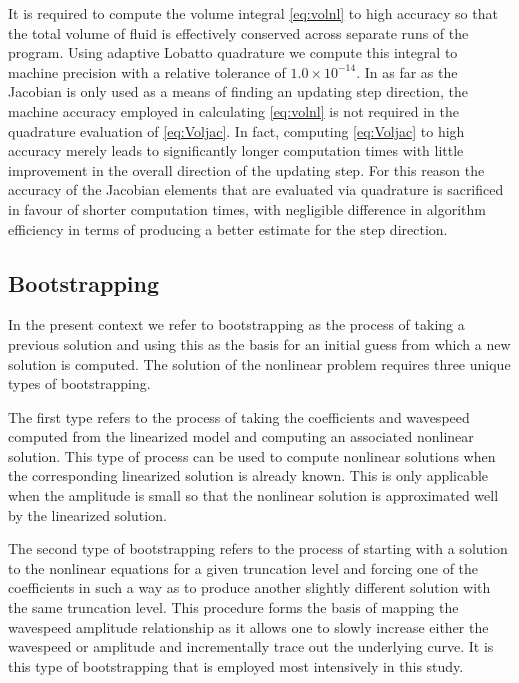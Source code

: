 It is required to compute the volume integral \eqref{eq:volnl} to high accuracy so that the total volume of fluid is effectively conserved across separate runs of the program. Using adaptive Lobatto quadrature we compute this integral to machine precision with a relative tolerance of $1.0\times10^{-14}$. In as far as the Jacobian is only used as a means of finding an updating step direction, the machine accuracy employed in calculating \eqref{eq:volnl} is not required in the quadrature evaluation of \eqref{eq:Voljac}. In fact, computing \eqref{eq:Voljac} to high accuracy merely leads to significantly longer computation times with little improvement in the overall direction of the updating step. For this reason the accuracy of the Jacobian elements that are evaluated via quadrature is sacrificed in favour of shorter computation times, with negligible difference in algorithm efficiency in terms of producing a better estimate for the step direction.

\subsection{Bootstrapping}
\label{subsec:bootstrap}
In the present context we refer to bootstrapping as the process of taking a previous solution and using this as the basis for an initial guess from which a new solution is computed. The solution of the nonlinear problem requires three unique types of bootstrapping.

The first type refers to the process of taking the coefficients and wavespeed computed from the linearized model and computing an associated nonlinear solution. This type of process can be used to compute nonlinear solutions when the corresponding linearized solution is already known. This is only applicable when the amplitude is small so that the nonlinear solution is approximated well by the linearized solution.

The second type of bootstrapping refers to the process of starting with a solution to the nonlinear equations for a given truncation level and forcing one of the coefficients in such a way as to produce another slightly different solution with the same truncation level. This procedure forms the basis of mapping the wavespeed amplitude relationship as it allows one to slowly increase either the wavespeed or amplitude and incrementally trace out the underlying curve. It is this type of bootstrapping that is employed most intensively in this study.

